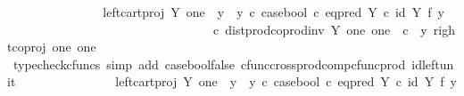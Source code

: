 \begin{isabellebody}
\ \ \ \ \ \ \ \ \ \ \isamarkupfalse%
\ \isamarkupfalse%
\ {\isachardoublequoteopen}{\isachardot}{\kern0pt}{\isachardot}{\kern0pt}{\isachardot}{\kern0pt}\ {\isacharequal}{\kern0pt}\ {\isacharparenleft}{\kern0pt}left{\isacharunderscore}{\kern0pt}cart{\isacharunderscore}{\kern0pt}proj\ Y\ one\ {\isasymamalg}\ {\isacharparenleft}{\kern0pt}{\isacharparenleft}{\kern0pt}y{}\ {\isasymamalg}\ y{}{\isacharparenright}{\kern0pt}\ {\isasymcirc}\isactrlsub c\ case{\isacharunderscore}{\kern0pt}bool\ {\isasymcirc}\isactrlsub c\ eq{\isacharunderscore}{\kern0pt}pred\ Y\ {\isasymcirc}\isactrlsub c\ {\isacharparenleft}{\kern0pt}id\ Y\ {\isasymtimes}\isactrlsub f\ y{}{\isacharparenright}{\kern0pt}{\isacharparenright}{\kern0pt}{\isacharparenright}{\kern0pt}\ \isanewline
\ \ \ \ \ \ \ \ \ \ \ \ \ \ \ \ \ \ \ \ \ \ \ \ \ \ \ \ \ \ \ \ \ {\isasymcirc}\isactrlsub c\ dist{\isacharunderscore}{\kern0pt}prod{\isacharunderscore}{\kern0pt}coprod{\isacharunderscore}{\kern0pt}inv\ Y\ one\ one\ \ {\isasymcirc}\isactrlsub c\ \ {\isasymlangle}y{}{\isacharcomma}{\kern0pt}\ right{\isacharunderscore}{\kern0pt}coproj\ one\ one{\isasymrangle}{\isachardoublequoteclose}\isanewline
\ \ \ \ \ \ \ \ \ \ \ \ \isamarkupfalse%
\ {\isacharparenleft}{\kern0pt}typecheck{\isacharunderscore}{\kern0pt}cfuncs{\isacharcomma}{\kern0pt}\ simp\ add{\isacharcolon}{\kern0pt}\ case{\isacharunderscore}{\kern0pt}bool{\isacharunderscore}{\kern0pt}false\ cfunc{\isacharunderscore}{\kern0pt}cross{\isacharunderscore}{\kern0pt}prod{\isacharunderscore}{\kern0pt}comp{\isacharunderscore}{\kern0pt}cfunc{\isacharunderscore}{\kern0pt}prod\ id{\isacharunderscore}{\kern0pt}left{\isacharunderscore}{\kern0pt}unit{}{\isacharparenright}{\kern0pt}\isanewline
\ \ \ \ \ \ \ \ \ \ \isamarkupfalse%
\ \isamarkupfalse%
\ {\isachardoublequoteopen}{\isachardot}{\kern0pt}{\isachardot}{\kern0pt}{\isachardot}{\kern0pt}\ {\isacharequal}{\kern0pt}\ {\isacharparenleft}{\kern0pt}left{\isacharunderscore}{\kern0pt}cart{\isacharunderscore}{\kern0pt}proj\ Y\ one\ {\isasymamalg}\ {\isacharparenleft}{\kern0pt}{\isacharparenleft}{\kern0pt}y{}\ {\isasymamalg}\ y{}{\isacharparenright}{\kern0pt}\ {\isasymcirc}\isactrlsub c\ case{\isacharunderscore}{\kern0pt}bool\ {\isasymcirc}\isactrlsub c\ eq{\isacharunderscore}{\kern0pt}pred\ Y\ {\isasymcirc}\isactrlsub c\ {\isacharparenleft}{\kern0pt}id\ Y\ {\isasymtimes}\isactrlsub f\ y{}{\isacharparenright}{\kern0pt}{\isacharparenright}{\kern0pt}{\isacharparenright}{\kern0pt}\isanewline

\end{isabellebody}
